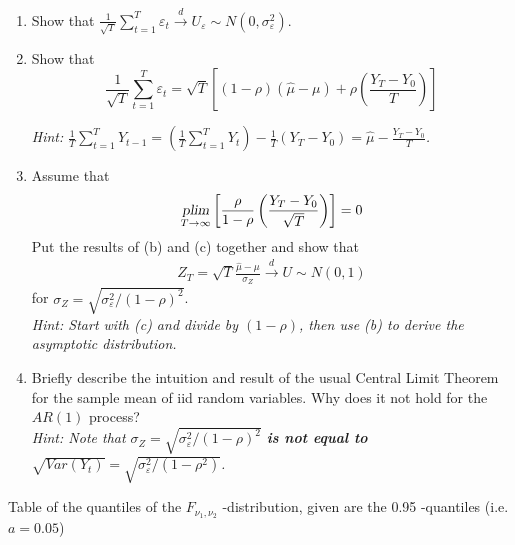 \documentclass{article}
\begin{document}
\begin{enumerate}[label=(\alph*)]
		\item Show that $\frac{1}{\sqrt{T} } \sum_{t=1}^T \varepsilon_t \overset{d}{\rightarrow} U_\varepsilon \sim N(0,\sigma_\varepsilon^2)$.
		\item Show that
		$$\frac{1}{\sqrt{T}} \sum_{t=1}^T \varepsilon_t = \sqrt{T}\left[(1-\rho)\left(\hat{\mu}-\mu\right) + \rho\left(\frac{Y_T - Y_0}{T}\right)\right]$$

		\textit{Hint: $\frac{1}{T}\sum_{t=1}^{T}Y_{t-1} = \left(\frac{1}{T}\sum_{t=1}^{T} Y_{t}\right) - \frac{1}{T} (Y_T - Y_0) = \hat{\mu} - \frac{Y_T - Y_0}{T}$.}
		\item Assume that
		$$\underset{T\rightarrow \infty}{\textsl{plim}}\left[\frac{\rho}{1-\rho}\left(\frac{Y_T - Y_0}{\sqrt{T}}\right)\right] = 0$$
		Put the results of (b) and (c) together and show that
		\begin{align}
		Z_{T} =\sqrt{T}\frac{\hat{\mu} -\mu }{\sigma_Z} \overset{d}{\rightarrow} U \sim N(0,1) \label{eq:AsymDistribAR1}
		\end{align}
		for $\sigma_Z=\sqrt{\sigma_\varepsilon^2/(1-\rho)^2}$.\\		
		\textit{Hint: Start with (c) and divide by $(1-\rho)$, then use (b) to derive the asymptotic distribution.}
		\item Briefly describe the intuition and result of the usual Central Limit Theorem for the sample mean of iid random variables. Why does it not hold for the $AR(1)$ process?\\
		\textit{Hint: Note that $\sigma_Z =\sqrt{\sigma_\varepsilon^2/(1-\rho)^2}$ \textbf{is not equal to} $\sqrt{Var(Y_t)} = \sqrt{\sigma_\varepsilon^2/(1-\rho^2)}$.}
\end{enumerate}


\newpage Table of the quantiles of the $F_{\nu _{1},\nu _{2}}$%
-distribution,	given are the 0.95 -quantiles (i.e. $a=0.05$)
\end{document}
